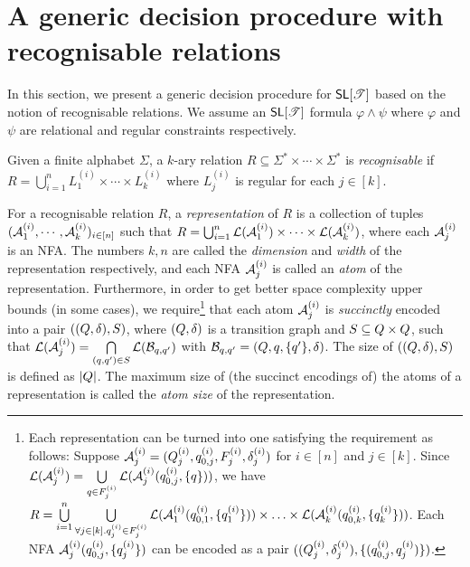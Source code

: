 



\section{A generic decision procedure with recognisable relations} \label{sec:algo}

In this section,  we present a generic decision procedure for $\textsf{SL}[\mathscr{T}]$ based on the notion of recognisable relations. We assume an $\textsf{SL}[\mathscr{T}]$ formula $\varphi \wedge \psi$ where $\varphi$ and $\psi$ are relational and  regular constraints respectively.

\begin{definition}
	Given a finite alphabet $\Sigma$, a $k$-ary relation $R\subseteq \Sigma^*\times \cdots\times \Sigma^*$ is \emph{recognisable}  if $R=\bigcup_{i=1}^n L^{(i)}_1\times \cdots\times L^{(i)}_k$ where $L^{(i)}_j$ is regular for each $j\in [k]$.
%
\end{definition}


For a recognisable relation $R$,  a \emph{representation} of $R$ is a collection of tuples $(\mathcal{A}^{(i)}_1, \cdots, \mathcal{A}^{(i)}_k)_{i\in [n]}$  such that 
$R = \bigcup_{i=1}^n \mathcal{L}(\mathcal{A}^{(i)}_1) \times \cdots\times \mathcal{L}(\mathcal{A}^{(i)}_k)$, where each $\mathcal{A}^{(i)}_j$ is an NFA. The numbers $k, n$ are called the \emph{dimension} and \emph{width}  of the representation respectively, and each NFA $\mathcal{A}^{(i)}_j$ is called an \emph{atom} of the representation.
Furthermore, in order to get better space complexity upper bounds (in some cases), we require\footnote{Each representation can be turned into one satisfying the requirement as follows: Suppose $\mathcal{A}^{(i)}_j=(Q^{(i)}_j, q^{(i)}_{0,j}, F^{(i)}_j, \delta^{(i)}_j)$ for $i \in [n]$ and $j \in [k]$. Since $\mathcal{L}(\mathcal{A}^{(i)}_j) = \bigcup \limits_{q \in F^{(i)}_j} \mathcal{L}(\mathcal{A}^{(i)}_j(q^{(i)}_{0,j}, \{q\}))$, we have $R = \bigcup \limits_{i=1}^n \bigcup \limits_{\forall j \in [k]. q^{(i)}_j \in F^{(i)}_j } \mathcal{L}(\mathcal{A}^{(i)}_1(q^{(i)}_{0, 1}, \{q^{(i)}_1\})) \times \ldots \times \mathcal{L}(\mathcal{A}^{(i)}_k(q^{(i)}_{0, k}, \{q^{(i)}_k\}))$. Each NFA $\mathcal{A}^{(i)}_j(q^{(i)}_{0, j}, \{q^{(i)}_j\})$ can be encoded as a pair $((Q^{(i)}_j,  \delta^{(i)}_j), \{(q^{(i)}_{0,j}, q^{(i)}_j)\})$.} 
%
that each atom $\mathcal{A}^{(i)}_j$ is \emph{succinctly} encoded into a pair $((Q, \delta), S)$, where $(Q, \delta)$ is a transition graph and $S \subseteq Q \times Q$, such that $\mathcal{L}(\mathcal{A}^{(i)}_j) = \bigcap \limits_{(q,q') \in S} \mathcal{L}(\mathcal{B}_{q,q'})$ with $\mathcal{B}_{q,q'} = (Q, q, \{q'\}, \delta)$. The size of $((Q, \delta), S)$ is defined as $|Q|$. The maximum size of (the succinct encodings of) the atoms of a representation is called the \emph{atom size} of the representation. 

